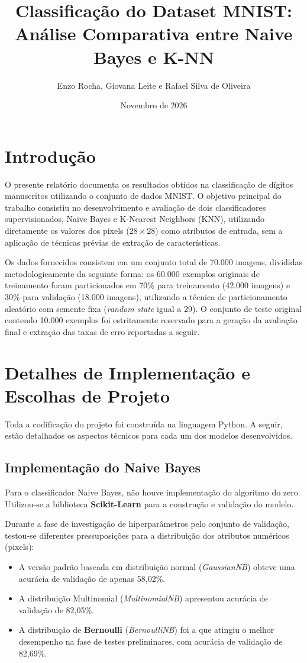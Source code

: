 \documentclass[12pt, a4paper]{article}
\title{\textbf{Classificação do Dataset MNIST: \\ Análise Comparativa entre Naive Bayes e K-NN}}
\author{Enzo Rocha, Giovana Leite e Rafael Silva de Oliveira}
\date{Novembro de 2026}
\begin{document}
\maketitle

\section{Introdução}
O presente relatório documenta os resultados obtidos na classificação de dígitos manuscritos utilizando o conjunto de dados MNIST. O objetivo principal do trabalho consistiu no desenvolvimento e avaliação de dois classificadores supervisionados, Naive Bayes e K-Nearest Neighbors (KNN), utilizando diretamente os valores dos pixels ($28 \times 28$) como atributos de entrada, sem a aplicação de técnicas prévias de extração de características.

Os dados fornecidos consistem em um conjunto total de 70.000 imagens, divididas metodologicamente da seguinte forma: os 60.000 exemplos originais de treinamento foram particionados em 70\% para treinamento (42.000 imagens) e 30\% para validação (18.000 imagens), utilizando a técnica de particionamento aleatório com semente fixa (\textit{random state} igual a 29). O conjunto de teste original contendo 10.000 exemplos foi estritamente reservado para a geração da avaliação final e extração das taxas de erro reportadas a seguir.

\section{Detalhes de Implementação e Escolhas de Projeto}

Toda a codificação do projeto foi construída na linguagem Python. A seguir, estão detalhados os aspectos técnicos para cada um dos modelos desenvolvidos.

\subsection{Implementação do Naive Bayes}
Para o classificador Naive Bayes, não houve implementação do algoritmo do zero. Utilizou-se a biblioteca \textbf{Scikit-Learn} para a construção e validação do modelo. 

Durante a fase de investigação de hiperparâmetros pelo conjunto de validação, testou-se diferentes pressuposições para a distribuição dos atributos numéricos (pixels):
\begin{itemize}
    \item A versão padrão baseada em distribuição normal (\textit{GaussianNB}) obteve uma acurácia de validação de apenas 58,02\%.
    \item A distribuição Multinomial (\textit{MultinomialNB}) apresentou acurácia de validação de 82,05\%.
    \item A distribuição de \textbf{Bernoulli} (\textit{BernoulliNB}) foi a que atingiu o melhor desempenho na fase de testes preliminares, com acurácia de validação de 82,69\%.
\end{itemize}
\end{document}
